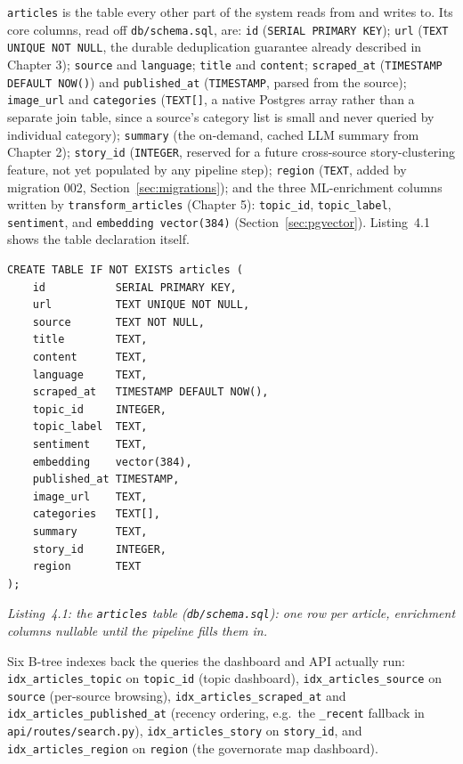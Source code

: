 \texttt{articles} is the table every other part of the system reads from and writes to. Its core columns, read off \texttt{db/schema.sql}, are: \texttt{id} (\texttt{SERIAL PRIMARY KEY}); \texttt{url} (\texttt{TEXT UNIQUE NOT NULL}, the durable deduplication guarantee already described in Chapter 3); \texttt{source} and \texttt{language}; \texttt{title} and \texttt{content}; \texttt{scraped\_at} (\texttt{TIMESTAMP DEFAULT NOW()}) and \texttt{published\_at} (\texttt{TIMESTAMP}, parsed from the source); \texttt{image\_url} and \texttt{categories} (\texttt{TEXT[]}, a native Postgres array rather than a separate join table, since a source's category list is small and never queried by individual category); \texttt{summary} (the on-demand, cached LLM summary from Chapter 2); \texttt{story\_id} (\texttt{INTEGER}, reserved for a future cross-source story-clustering feature, not yet populated by any pipeline step); \texttt{region} (\texttt{TEXT}, added by migration 002, Section~\ref{sec:migrations}); and the three ML-enrichment columns written by \texttt{transform\_articles} (Chapter 5): \texttt{topic\_id}, \texttt{topic\_label}, \texttt{sentiment}, and \texttt{embedding vector(384)} (Section~\ref{sec:pgvector}). Listing~4.1 shows the table declaration itself.

\begin{verbatim}
CREATE TABLE IF NOT EXISTS articles (
    id           SERIAL PRIMARY KEY,
    url          TEXT UNIQUE NOT NULL,
    source       TEXT NOT NULL,
    title        TEXT,
    content      TEXT,
    language     TEXT,
    scraped_at   TIMESTAMP DEFAULT NOW(),
    topic_id     INTEGER,
    topic_label  TEXT,
    sentiment    TEXT,
    embedding    vector(384),
    published_at TIMESTAMP,
    image_url    TEXT,
    categories   TEXT[],
    summary      TEXT,
    story_id     INTEGER,
    region       TEXT
);
\end{verbatim}
\begin{center}
\textit{Listing~4.1: the \texttt{articles} table (\texttt{db/schema.sql}): one row per article, enrichment columns nullable until the pipeline fills them in.}
\end{center}

Six B-tree indexes back the queries the dashboard and API actually run: \texttt{idx\_\allowbreak articles\_\allowbreak topic} on \texttt{topic\_id} (topic dashboard), \texttt{idx\_\allowbreak articles\_\allowbreak source} on \texttt{source} (per-source browsing), \texttt{idx\_\allowbreak articles\_\allowbreak scraped\_at} and \texttt{idx\_\allowbreak articles\_\allowbreak published\_at} (recency ordering, e.g.\ the \texttt{\_recent} fallback in \texttt{api/routes/search.py}), \texttt{idx\_\allowbreak articles\_\allowbreak story} on \texttt{story\_id}, and \texttt{idx\_\allowbreak articles\_\allowbreak region} on \texttt{region} (the governorate map dashboard).

